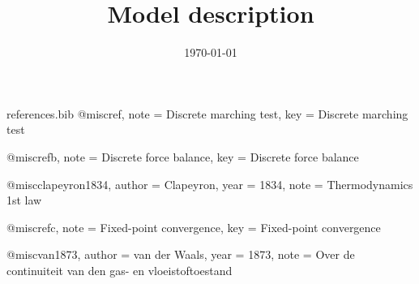 \begin{filecontents*}[overwrite]{references.bib}
@misc{ref,
  note   = {Discrete marching test},
  key    = {Discrete marching test}
}

@misc{refb,
  note   = {Discrete force balance},
  key    = {Discrete force balance}
}

@misc{clapeyron1834,
  author = {Clapeyron},
  year   = {1834},
  note   = {Thermodynamics 1st law}
}

@misc{refc,
  note   = {Fixed-point convergence},
  key    = {Fixed-point convergence}
}

@misc{van1873,
  author = {van der Waals},
  year   = {1873},
  note   = {Over de continuiteit van den gas- en vloeistoftoestand}
}
\end{filecontents*}
\documentclass[11pt,a4paper]{article}
\usepackage[T1]{fontenc}
\usepackage[utf8]{inputenc}
\usepackage{lmodern}
\usepackage{amsmath,amssymb}
\usepackage{booktabs,longtable}
\usepackage{siunitx}
\usepackage{algorithm}
\usepackage{algpseudocode}
\usepackage{tikz}
\usetikzlibrary{positioning,shapes.geometric,shapes.misc,arrows.meta}
\usepackage{adjustbox}
\usepackage[hidelinks]{hyperref}

\title{Model description}
\author{}
\date{\today}


\maketitle

The model consists of 5 equations in 14 variables: 9 inputs, 2 state variables, 2 intermediate variables and 1 output. It is solved in 3 steps (Algorithm~\ref{alg:solution}).

